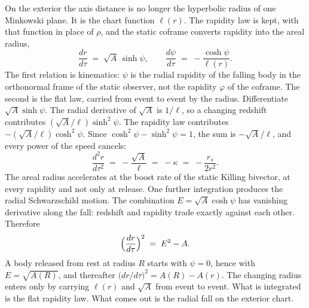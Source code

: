 \documentclass[a4paper]{article}
\begin{document}
On the exterior the axis distance is no longer the hyperbolic radius of one Minkowski plane. It is the chart function \(\ell(r)\). The rapidity law is kept, with that function in place of \(\rho\), and the static coframe converts rapidity into the areal radius,
\begin{equation}
\frac{dr}{d\tau} \;=\; \sqrt{A}\,\sinh\psi,
\qquad
\frac{d\psi}{d\tau} \;=\; -\frac{\cosh\psi}{\ell(r)}.
\label{eq:fall-rapidity}
\end{equation}
The first relation is kinematics: \(\psi\) is the radial rapidity of the falling body in the orthonormal frame of the static observer, not the rapidity \(\varphi\) of the coframe. The second is the flat law, carried from event to event by the radius. Differentiate \(\sqrt{A}\sinh\psi\). The radial derivative of \(\sqrt{A}\) is \(1/\ell\), so a changing redshift contributes \((\sqrt{A}/\ell)\sinh^{2}\psi\). The rapidity law contributes \(-(\sqrt{A}/\ell)\cosh^{2}\psi\). Since \(\cosh^{2}\psi-\sinh^{2}\psi=1\), the sum is \(-\sqrt{A}/\ell\), and every power of the speed cancels:
\begin{equation}
\frac{d^{2}r}{d\tau^{2}} \;=\; -\frac{\sqrt{A}}{\ell} \;=\; -\kappa \;=\; -\frac{r_{s}}{2r^{2}}.
\label{eq:areal-accel}
\end{equation}
The areal radius accelerates at the boost rate of the static Killing bivector, at every rapidity and not only at release. One further integration produces the radial Schwarzschild motion. The combination \(E=\sqrt{A}\cosh\psi\) has vanishing derivative along the fall: redshift and rapidity trade exactly against each other. Therefore
\begin{equation}
\Bigl(\frac{dr}{d\tau}\Bigr)^{2} \;=\; E^{2}-A.
\label{eq:radial-energy}
\end{equation}
A body released from rest at radius \(R\) starts with \(\psi=0\), hence with \(E=\sqrt{A(R)}\), and thereafter \(\bigl(dr/d\tau\bigr)^{2}=A(R)-A(r)\). The changing radius enters only by carrying \(\ell(r)\) and \(\sqrt{A}\) from event to event. What is integrated is the flat rapidity law. What comes out is the radial fall on the exterior chart.
\end{document}
